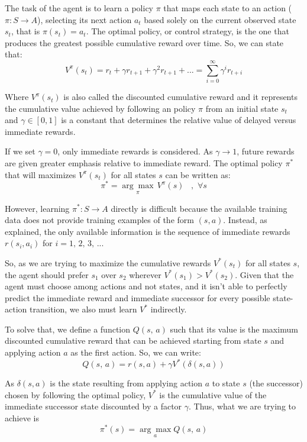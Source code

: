 \documentclass[a4paper]{article}
\begin{document}
The task of the agent is to learn a policy $\pi$ that maps each state to an action ($\pi: S \rightarrow A$), selecting its next action $a_t$ based solely on the current observed state $s_t$, that is $\pi(s_t)=a_t$. The optimal policy, or control strategy, is the one that produces the greatest possible cumulative reward over time. So, we can state that:
$$V^{\pi}(s_t)= r_t + \gamma r_{t+1} + \gamma^2 r_{t+1} + ... = \sum_{i=0}^{\infty} \gamma^{i} r_{t+i}$$

Where $V^{\pi}(s_t)$ is also called the discounted cumulative reward and it represents the cumulative value achieved by following an policy $\pi$ from an initial state $s_t$ and $\gamma \in [0, 1]$ is a constant that determines the relative value of delayed versus immediate rewards.

If we set $\gamma=0$, only immediate rewards is considered. As $\gamma \rightarrow 1$, future rewards are given greater emphasis relative to immediate reward. The optimal policy $\pi^{*}$ that will maximizes $V^{\pi}(s_t)$ for all states $s$ can be written as:
$$\pi^{*} = \underset{\pi}{\arg \max} \, V^{\pi} (s)\,\,\,\,\,, \,\, \forall s$$

However, learning $\pi^{*}: S \rightarrow A$ directly is difficult because the available training data does not provide training examples of the form $(s, a)$. Instead, as \cite{Mitchell} explained, the only available information is the sequence of immediate rewards $r(s_i, a_i)$ for $i=1,\, 2,\, 3,\,...$

So, as we are trying to maximize the cumulative rewards $V^{*}(s_t)$ for all states $s$, the agent should prefer $s_1$ over $s_2$ wherever $V^{*}(s_1) > V^{*}(s_2)$. Given that the agent must choose among actions and not states, and it isn't able to perfectly predict the immediate reward and immediate successor for every possible state-action transition, we also must learn $V^{*}$ indirectly.

To solve that, we define a function $Q(s, \, a)$ such that its value is the maximum discounted cumulative reward that can be achieved starting from state $s$ and applying action $a$ as the first action. So, we can write:
$$Q(s, \, a) = r(s, a) + \gamma V^{*}(\delta(s, a))$$

As $\delta(s, a)$ is the state resulting from applying action $a$ to state $s$ (the successor) chosen by following the optimal policy, $V^{*}$ is the cumulative value of the immediate successor state discounted by a factor $\gamma$. Thus,  what we are trying to achieve is
$$\pi^{*}(s) = \underset{a}{\arg \max} Q(s, \, a)$$
\end{document}
